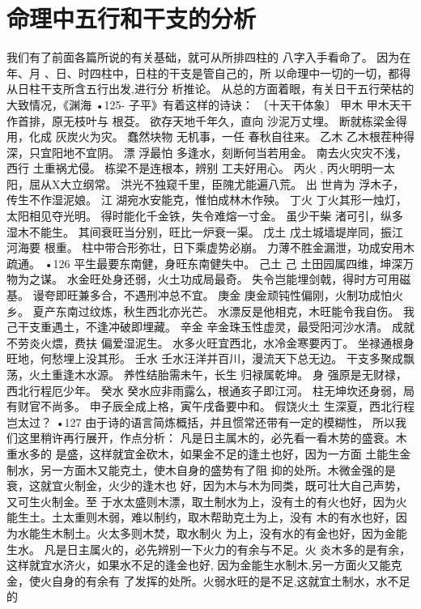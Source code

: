 \section{命理中五行和干支的分析}
我们有了前面各篇所说的有关基础，就可从所排四柱的
八字入手看命了。
因为在年、月 、日、时四柱中，日柱的干支是管自己的，所
以命理中一切的一切，都得从日柱干支所含五行出发,进行分
析推论。
从总的方面着眼，有关日干五行荣枯的大致情况，《渊海
•125-
子平》有着这样的诗诀：
〔十天干体象〕
甲木
甲木天干作首排，原无枝叶与 根芟。
欲存天地千年久，直向 沙泥万丈埋。
断就栋梁金得用，化成 灰炭火为灾。
蠢然块物 无机事，一任 春秋自往来。
乙木
乙木根茬种得深，只宜阳地不宜阴。
漂 浮最怕 多逢水，刻断何当若用金。
南去火灾灾不浅，西行 土重祸尤侵。
栋梁不是连根本，辨别 工夫好用心。
丙火 ,
丙火明明一太阳，屈从X大立纲常。
洪光不独窥千里，臣隗尤能遍八荒。
出 世肯为 浮木子，传生不作湿泥娘。
江 湖宛水安能克，惟怕成林木作殃。
丁火
丁火其形一烛灯，太阳相见夺光明。
得时能化千金铁，失令难熔一寸金。
虽少干柴 渚可引，纵多 湿木不能生。
其间衰旺当分别，旺比一炉衰一渠。
戊土
戊土城墙堤岸同，振江 河海要 根重。
柱中带合形弥壮，日下乘虚势必崩。
力薄不胜金漏泄，功成安用木疏通。
•126
平生最要东南健，身旺东南健失中。
己土
己 土田园属四维，坤深万物为之谋。
水金旺处身还弱，火土功成局最奇。
失令岂能埋剑戟，得时方可用磁基。
谩夸即旺兼多合，不遇刑冲总不宜。
庚金
庚金顽钝性偏刚，火制功成怕火乡。
夏产东南过纹炼，秋生西北亦光芒。
水漂反是他相克，木旺能令我自伤。
我 己干支重遇土，不逢冲破即埋藏。
辛金
辛金珠玉性虚灵，最受阳河沙水清。
成就不劳炎火煨，费扶 偏爱湿泥生。
水多火旺宜西北，水冷金寒要丙丁。
坐禄通根身旺地，何愁埋上没其形。
壬水
壬水汪洋并百川，漫流天下总无边。
干支多聚成飘荡，火土重逢木水源。
养性结胎需未午，长生 归禄属乾坤。
身 强原是无财禄，西北行程厄少年。
癸水
癸水应非雨露么，根通亥子即江河。
柱无坤坎还身弱，局有财官不尚多。
申子辰全成上格，寅午戌备要中和。
假饶火土 生深夏，西北行程岂太过？
•127
由于诗的语言简炼概括，并且惯常还带有一定的模糊性，
所以我们这里稍许再行展开，作点分析：
凡是日主属木的，必先看一看木势的盛衰。木重水多的
是盛，这样就宜金砍木，如果金不足的逢土也好，因为一方面
土能生金制水，另一方面木又能克土，使木自身的盛势有了阻
抑的处所。木微金强的是衰，这就宜火制金，火少的逢木也
好，因为木与木为同类，既可壮大自己声势，又可生火制金。至
于水太盛则木漂，取土制水为上，没有土的有火也好，因为火
能生土。土太重则木弱，难以制约，取木帮助克土为上，没有
木的有水也好，因为水能生木制土。火太多则木焚，取水制火
为上，没有水的有金也好，因为金能生水。
凡是日主属火的，必先辨别一下火力的有余与不足。火
炎木多的是有余，这样就宜水济火，如果水不足的逢金也好,
因为金能生水制木,另一方面火又能克金，使火自身的有余有
了发挥的处所。火弱水旺的是不足,这就宜土制水，水不足的

